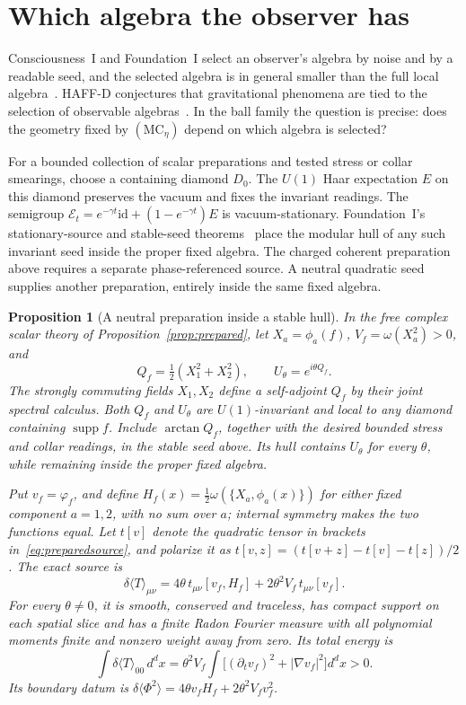\documentclass[12pt]{article}
\newtheorem{proposition}[theorem]{Proposition}
\theoremstyle{definition}
\theoremstyle{remark}
\newcommand{\dT}{\delta\langle T\rangle}
\newcommand{\ev}[1]{\langle #1\rangle}
\begin{document}
\section{Which algebra the observer has}\label{sec:selection}

Consciousness~I and Foundation~I select an observer's algebra by noise and by a readable
seed, and the selected algebra is in general smaller than the full local
algebra~\cite{PaperI,FoundationI}. HAFF-D conjectures that gravitational phenomena are tied
to the selection of observable algebras~\cite{HAFFD}. In the ball family the question is
precise: does the geometry fixed by \((\mathrm{MC}_\eta)\) depend on which algebra is
selected?

For a bounded collection of scalar preparations and tested stress or collar
smearings, choose a containing diamond \(D_0\). The \(U(1)\) Haar expectation \(E\)
on this diamond preserves the vacuum and fixes the invariant readings.
The semigroup \(\mathcal E_t=e^{-\gamma t}\mathrm{id}+(1-e^{-\gamma t})E\) is
vacuum-stationary. Foundation~I's stationary-source and stable-seed
theorems~\cite{FoundationI} place the modular hull of any such invariant seed inside
the proper fixed algebra. The charged coherent preparation above requires a separate
phase-referenced source. A neutral quadratic seed supplies another preparation,
entirely inside the same fixed algebra.

\begin{proposition}[A neutral preparation inside a stable hull]\label{prop:neutral}
In the free complex scalar theory of Proposition~\ref{prop:prepared}, let
\(X_a=\phi_a(f)\), \(V_f=\omega(X_a^2)>0\), and
\[
Q_f=\tfrac12(X_1^2+X_2^2),\qquad U_\theta=e^{i\theta Q_f}.
\]
The strongly commuting fields \(X_1,X_2\) define a self-adjoint \(Q_f\) by their
joint spectral calculus. Both \(Q_f\) and \(U_\theta\) are \(U(1)\)-invariant and
local to any diamond containing \(\operatorname{supp}f\).
Include \(\arctan Q_f\), together with the desired bounded stress and collar
readings, in the stable seed above. Its hull contains \(U_\theta\) for every
\(\theta\), while remaining inside the proper fixed algebra.

Put \(v_f=\varphi_f\), and define
\(H_f(x)=\tfrac12\omega(\{X_a,\phi_a(x)\})\) for either fixed component
\(a=1,2\), with no sum over \(a\); internal symmetry makes the two functions equal.
Let \(t[v]\) denote the quadratic tensor in brackets in~\eqref{eq:preparedsource},
and polarize it as \(t[v,z]=(t[v+z]-t[v]-t[z])/2\). The exact source is
\begin{equation}\label{eq:neutralsource}
\dT_{\mu\nu}=4\theta\,t_{\mu\nu}[v_f,H_f]
                 +2\theta^2 V_f\,t_{\mu\nu}[v_f].
\end{equation}
For every \(\theta\ne0\), it is smooth, conserved and traceless, has compact support
on each spatial slice and has a finite Radon Fourier measure with all polynomial
moments finite and nonzero weight away from zero. Its total energy is
\[
\int\dT_{00}\,d^dx
=\theta^2 V_f\int\big[(\partial_t v_f)^2+|\nabla v_f|^2\big]d^dx>0.
\]
Its boundary datum is
\(\delta\ev{\Phi^2}=4\theta v_fH_f+2\theta^2V_fv_f^2\).
\end{proposition}
\end{document}

